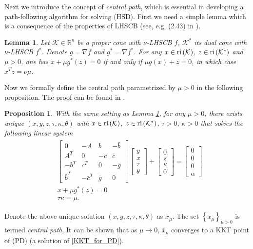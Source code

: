 \documentclass[10pt]{article}
\theoremstyle{definition}
\theoremstyle{plain}
\newtheorem{lemma}{Lemma}%
\newtheorem{prop}{Proposition}
\def\interior{\protect{\textnormal{ri}}}
\def\relint{\protect{\textnormal{ri}}}
\begin{document}
Next we introduce the concept of \textit{central path}, which is essential in developing a path-following algorithm for solving (HSD). First we need a simple lemma which is a consequence of the properties of LHSCB (see, e.g. (2.43) in \cite{Robert_thesis}).
\begin{lemma}\label{x^plus_mu_g_dual_z_equals_0}
	Let $\mathcal{K}\in \mathbb{R}^n$ be a proper cone with $\nu$-LHSCB $f$, $\mathcal{K}^*$ its dual cone with $\nu$-LHSCB $f^*$. Denote $g = \nabla f$ and $g^* = \nabla f^*$. For any $x\in \interior\left(\mathcal{K}\right)$, $z\in \interior\left(\mathcal{K}^*\right)$ and $\mu > 0$, one has $x + \mu g^*(z) = 0$ if and only if $\mu g(x) + z = 0$, in which case $x^T z = \nu \mu$.
\end{lemma}
Now we formally define the central path parametrized by $\mu > 0$ in the following proposition. The proof can be found in \cite{Akle_thesis}.
	\begin{prop}
	With the same setting as Lemma \ref{x^plus_mu_g_dual_z_equals_0}, for any $\mu > 0$, there exists unique $\left(x, y, z, \tau, \kappa, \theta\right)$ with $x \in \interior\left(\mathcal{K}\right)$, $z \in \relint\left(\mathcal{K}^*\right)$, $\tau > 0$, $\kappa > 0$ that solves the following linear system
	\begin{align}\label{central^path_mu}
	\begin{split}
	&  \begin{bmatrix}
	0 & -A & b & -\bar b\ \\ 
	A^T & 0 & -c & \bar c \\
	-b^T & c^T& 0 & -\bar g \\
	\bar b^T & -\bar c^T & \bar g & 0
	\end{bmatrix}
	\begin{bmatrix}
	y \\ x \\ \tau \\ \theta
	\end{bmatrix} + 
	\begin{bmatrix}
	0 \\ z \\ \kappa \\ 0 
	\end{bmatrix} = 
	\begin{bmatrix}
	0 \\ 0 \\ 0 \\ \bar \alpha
	\end{bmatrix}\\
	& x + \mu g^*\left(z\right) = 0\\
	& \tau \kappa = \mu.
	\end{split}
	\end{align}
\end{prop}
Denote the above unique solution $(x,y,z,\tau,\kappa,\theta)$ as $\bar{x}_{\mu}$. The set $\left\{\bar{x}_{\mu} \right\}_{\mu > 0}$ is termed \textit{central path}. It can be shown that as $\mu \rightarrow 0$, $\bar{x}_{\mu}$ converges to a KKT point of (PD) (a solution of \eqref{KKT_for_PD}). \\ 
\end{document}
